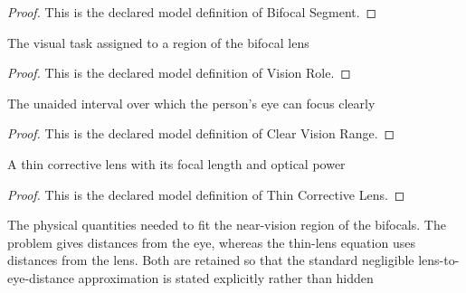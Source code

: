 \begin{proof}
  This is the declared model definition of Bifocal Segment.
\end{proof}
\begin{definition}
  \label{def:physics:phyx-mini-0029:phyxminiproblems-problemphyxmini0029-visionrole}
  The visual task assigned to a region of the bifocal lens
\end{definition}
\begin{proof}
  This is the declared model definition of Vision Role.
\end{proof}
\begin{definition}
  \label{def:physics:phyx-mini-0029:phyxminiproblems-problemphyxmini0029-clearvisionrange}
  The unaided interval over which the person's eye can focus clearly
\end{definition}
\begin{proof}
  This is the declared model definition of Clear Vision Range.
\end{proof}
\begin{definition}
  \label{def:physics:phyx-mini-0029:phyxminiproblems-problemphyxmini0029-thincorrectivelens}
  A thin corrective lens with its focal length and optical power
\end{definition}
\begin{proof}
  This is the declared model definition of Thin Corrective Lens.
\end{proof}
\begin{definition}
  \label{def:physics:phyx-mini-0029:phyxminiproblems-problemphyxmini0029-bifocalfitting}
  The physical quantities needed to fit the near-vision region of the bifocals. The problem gives distances from the eye, whereas the thin-lens equation uses distances from the lens. Both are retained so that the standard negligible lens-to-eye-distance approximation is stated explicitly rather than hidden
\end{definition}
